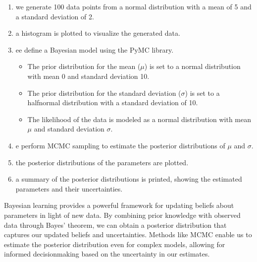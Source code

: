 \documentclass[letterpaper,10pt,english]{jupyterBook}
\begin{document}
\begin{enumerate}
%
\item {} 
\sphinxAtStartPar
{} we generate 100 data points from a normal distribution with a mean of 5 and a standard deviation of 2.

\item {} 
\sphinxAtStartPar
{} a histogram is plotted to visualize the generated data.

\item {} 
\sphinxAtStartPar
{} ee define a Bayesian model using the PyMC library.
\begin{itemize}
\item {} 
\sphinxAtStartPar
The prior distribution for the mean (\(\mu\)) is set to a normal distribution with mean 0 and standard deviation 10.

\item {} 
\sphinxAtStartPar
The prior distribution for the standard deviation (\(\sigma\)) is set to a half\sphinxhyphen{}normal distribution with a standard deviation of 10.

\item {} 
\sphinxAtStartPar
The likelihood of the data is modeled as a normal distribution with mean \(\mu\) and standard deviation \(\sigma\).

\end{itemize}

\item {} 
\sphinxAtStartPar
{} e perform MCMC sampling to estimate the posterior distributions of \(\mu\) and \(\sigma\).

\item {} 
\sphinxAtStartPar
{} the posterior distributions of the parameters are plotted.

\item {} 
\sphinxAtStartPar
{} a summary of the posterior distributions is printed, showing the estimated parameters and their uncertainties.

\end{enumerate}

\sphinxAtStartPar
Bayesian learning provides a powerful framework for updating beliefs about parameters in light of new data. By combining prior knowledge with observed data through Bayes’ theorem, we can obtain a posterior distribution that captures our updated beliefs and uncertainties. Methods like MCMC enable us to estimate the posterior distribution even for complex models, allowing for informed decision\sphinxhyphen{}making based on the uncertainty in our estimates.
\end{document}
